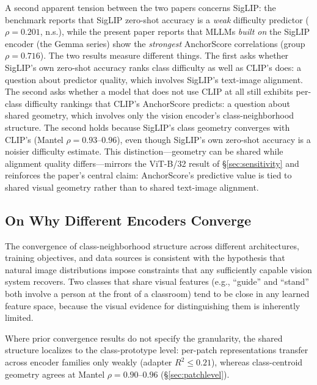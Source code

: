 \documentclass[a4paper,fleqn]{cas-sc}
\begin{document}
A second apparent tension between the two papers concerns SigLIP: the benchmark reports that SigLIP zero-shot accuracy is a \emph{weak} difficulty predictor ($\rho=0.201$, n.s.), while the present paper reports that MLLMs \emph{built on} the SigLIP encoder (the Gemma series) show the \emph{strongest} AnchorScore correlations (group $\rho=0.716$). The two results measure different things. The first asks whether SigLIP's own zero-shot accuracy ranks class difficulty as well as CLIP's does: a question about predictor quality, which involves SigLIP's text-image alignment. The second asks whether a model that does not use CLIP at all still exhibits per-class difficulty rankings that CLIP's AnchorScore predicts: a question about shared geometry, which involves only the vision encoder's class-neighborhood structure. The second holds because SigLIP's class geometry converges with CLIP's (Mantel $\rho=0.93$--$0.96$), even though SigLIP's own zero-shot accuracy is a noisier difficulty estimate. This distinction---geometry can be shared while alignment quality differs---mirrors the ViT-B/32 result of \S\ref{sec:sensitivity} and reinforces the paper's central claim: AnchorScore's predictive value is tied to shared visual geometry rather than to shared text-image alignment.

\subsection{On Why Different Encoders Converge}

The convergence of class-neighborhood structure across different architectures, training objectives, and data sources is consistent with the hypothesis that natural image distributions impose constraints that any sufficiently capable vision system recovers. Two classes that share visual features (e.g., ``guide'' and ``stand'' both involve a person at the front of a classroom) tend to be close in any learned feature space, because the visual evidence for distinguishing them is inherently limited.

Where prior convergence results do not specify the granularity, the shared structure localizes to the class-prototype level: per-patch representations transfer across encoder families only weakly (adapter $R^2 \le 0.21$), whereas class-centroid geometry agrees at Mantel $\rho=0.90$--$0.96$ (\S\ref{sec:patchlevel}).
\end{document}
